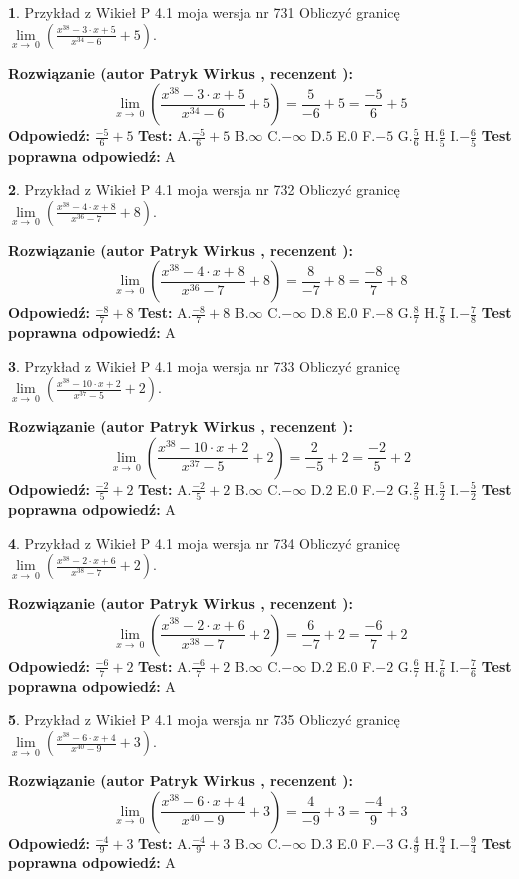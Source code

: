 \documentclass[12pt, a4paper]{article}
\theoremstyle{definition} %
\newtheorem{zad}{}
\newcommand{\zadStart}[1]{\begin{zad}#1\newline}
\newcommand{\zadStop}{\end{zad}}
\newcommand{\rozwStart}[2]{\noindent \textbf{Rozwiązanie (autor #1 , recenzent #2): }\newline}
\newcommand{\rozwStop}{\newline}
\newcommand{\odpStart}{\noindent \textbf{Odpowiedź:}\newline}
\newcommand{\odpStop}{\newline}
\newcommand{\testStart}{\noindent \textbf{Test:}\newline}
\newcommand{\testStop}{\newline}
\newcommand{\kluczStart}{\noindent \textbf{Test poprawna odpowiedź:}\newline}
\newcommand{\kluczStop}{\newline}
\begin{document}
\zadStart{Przykład z Wikieł P 4.1 moja wersja nr 731}
Obliczyć granicę $\lim\limits_{x\to\ 0}(\frac{x^{38}-3 \cdot x +5}{x^{34}-6}+5)$.
\zadStop
\rozwStart{Patryk Wirkus}{}
$$\lim\limits_{x\to\ 0}(\frac{x^{38}-3 \cdot x +5}{x^{34}-6}+5)=\frac{5}{-6}+5=\frac{-5}{6}+5$$
\rozwStop
\odpStart
$\frac{-5}{6}+5$
\odpStop
\testStart
A.$\frac{-5}{6}+5$
B.$\infty$
C.$-\infty$
D.$5$
E.$0$
F.$-5$
G.$\frac{5}{6}$
H.$\frac{6}{5}$
I.$-\frac{6}{5}$
\testStop
\kluczStart
A
\kluczStop



\zadStart{Przykład z Wikieł P 4.1 moja wersja nr 732}
Obliczyć granicę $\lim\limits_{x\to\ 0}(\frac{x^{38}-4 \cdot x +8}{x^{36}-7}+8)$.
\zadStop
\rozwStart{Patryk Wirkus}{}
$$\lim\limits_{x\to\ 0}(\frac{x^{38}-4 \cdot x +8}{x^{36}-7}+8)=\frac{8}{-7}+8=\frac{-8}{7}+8$$
\rozwStop
\odpStart
$\frac{-8}{7}+8$
\odpStop
\testStart
A.$\frac{-8}{7}+8$
B.$\infty$
C.$-\infty$
D.$8$
E.$0$
F.$-8$
G.$\frac{8}{7}$
H.$\frac{7}{8}$
I.$-\frac{7}{8}$
\testStop
\kluczStart
A
\kluczStop



\zadStart{Przykład z Wikieł P 4.1 moja wersja nr 733}
Obliczyć granicę $\lim\limits_{x\to\ 0}(\frac{x^{38}-10 \cdot x +2}{x^{37}-5}+2)$.
\zadStop
\rozwStart{Patryk Wirkus}{}
$$\lim\limits_{x\to\ 0}(\frac{x^{38}-10 \cdot x +2}{x^{37}-5}+2)=\frac{2}{-5}+2=\frac{-2}{5}+2$$
\rozwStop
\odpStart
$\frac{-2}{5}+2$
\odpStop
\testStart
A.$\frac{-2}{5}+2$
B.$\infty$
C.$-\infty$
D.$2$
E.$0$
F.$-2$
G.$\frac{2}{5}$
H.$\frac{5}{2}$
I.$-\frac{5}{2}$
\testStop
\kluczStart
A
\kluczStop



\zadStart{Przykład z Wikieł P 4.1 moja wersja nr 734}
Obliczyć granicę $\lim\limits_{x\to\ 0}(\frac{x^{38}-2 \cdot x +6}{x^{38}-7}+2)$.
\zadStop
\rozwStart{Patryk Wirkus}{}
$$\lim\limits_{x\to\ 0}(\frac{x^{38}-2 \cdot x +6}{x^{38}-7}+2)=\frac{6}{-7}+2=\frac{-6}{7}+2$$
\rozwStop
\odpStart
$\frac{-6}{7}+2$
\odpStop
\testStart
A.$\frac{-6}{7}+2$
B.$\infty$
C.$-\infty$
D.$2$
E.$0$
F.$-2$
G.$\frac{6}{7}$
H.$\frac{7}{6}$
I.$-\frac{7}{6}$
\testStop
\kluczStart
A
\kluczStop



\zadStart{Przykład z Wikieł P 4.1 moja wersja nr 735}
Obliczyć granicę $\lim\limits_{x\to\ 0}(\frac{x^{38}-6 \cdot x +4}{x^{40}-9}+3)$.
\zadStop
\rozwStart{Patryk Wirkus}{}
$$\lim\limits_{x\to\ 0}(\frac{x^{38}-6 \cdot x +4}{x^{40}-9}+3)=\frac{4}{-9}+3=\frac{-4}{9}+3$$
\rozwStop
\odpStart
$\frac{-4}{9}+3$
\odpStop
\testStart
A.$\frac{-4}{9}+3$
B.$\infty$
C.$-\infty$
D.$3$
E.$0$
F.$-3$
G.$\frac{4}{9}$
H.$\frac{9}{4}$
I.$-\frac{9}{4}$
\testStop
\kluczStart
A
\kluczStop
\end{document}
